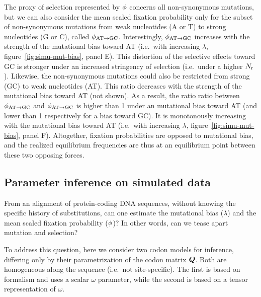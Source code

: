 \documentclass{article}
\begin{document}
The proxy of selection represented by $\phi$ concerns all {non-synonymous} mutations, but we can also consider the mean scaled fixation probability only for the subset of {non-synonymous} mutations from weak nucleotides (A or T) to strong nucleotides (G or C), called $\phi_{\text{AT} \rightarrow \text{GC}}$.
Interestingly, $\phi_{\text{AT} \rightarrow \text{GC}}$ increases with the strength of the mutational bias toward AT (i.e.~with increasing $\lambda$, figure~\ref{fig:simu-mut-bias}, panel E).
This distortion of the selective effects toward GC is stronger under an increased stringency of selection (i.e.~under a higher $N_{\text{r}}$).
Likewise, the {non-synonymous} mutations could also be restricted from strong (GC) to weak nucleotides (AT).
This ratio decreases with the strength of the mutational bias toward AT (not shown).
As a result, the ratio ratio between $\phi_{\text{AT} \rightarrow \text{GC}}$ and $\phi_{\text{AT} \rightarrow \text{GC}}$ is higher than 1 under an mutational bias toward AT (and lower than 1 respectively for a bias toward GC).
It is monotonously increasing with the mutational bias toward AT (i.e.~with increasing $\lambda$, figure~\ref{fig:simu-mut-bias}, panel F).
Altogether, fixation probabilities are opposed to mutational bias, and the realized equilibrium frequencies are thus at an equilibrium point between these two opposing forces.

\subsection{Parameter inference on simulated data}
\label{subsec:parameter-inference-on-simulated-data}

From an alignment of protein-coding {DNA} sequences, without knowing the specific history of {substitutions}, can one estimate the mutational bias ($\lambda$) and the mean scaled fixation probability ($\phi$)?
In other words, can we tease apart mutation and selection?

To address this question, here we consider two codon models for inference, differing only by their parametrization of the codon matrix $\bm{Q}$.
Both are homogeneous along the sequence (i.e.~not site-specific).
The first is based on \citet{Muse1994} formalism and uses a scalar $\omega$ parameter, while the second is based on a tensor representation of $\omega$.
\end{document}
